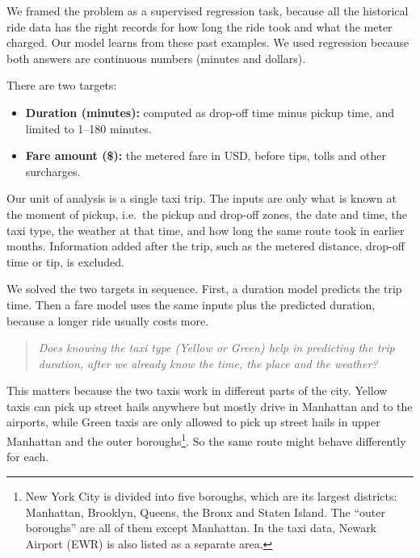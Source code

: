 \documentclass[12pt,a4paper]{article}
\makeatletter
\renewcommand\subsection{\@startsection{subsection}{2}{\z@}{-1.6ex\@plus -0.4ex \@minus -.2ex}{0.6ex \@plus .2ex}{\normalfont\large\bfseries}}
\makeatother
\begin{document}
We framed the problem as a supervised regression task, because all the historical ride data has the right records for how long the ride took and what the meter charged. Our model learns from these past examples. We used regression because both answers are continuous numbers (minutes and dollars).

There are two targets:
\begin{itemize}
  \item \textbf{Duration (minutes):} computed as drop-off time minus pickup time, and limited to 1--180 minutes.
  \item \textbf{Fare amount (\$):} the metered fare in USD, before tips, tolls and other surcharges.
\end{itemize}

Our unit of analysis is a single taxi trip. The inputs are only what is known at the moment of pickup, i.e.\ the pickup and drop-off zones, the date and time, the taxi type, the weather at that time, and how long the same route took in earlier months. Information added after the trip, such as the metered distance, drop-off time or tip, is excluded.

We solved the two targets in sequence. First, a duration model predicts the trip time. Then a fare model uses the same inputs plus the predicted duration, because a longer ride usually costs more.

\subsection{Research Question}

\begin{quote}
\itshape Does knowing the taxi type (Yellow or Green) help in predicting the trip duration, after we already know the time, the place and the weather?
\end{quote}

This matters because the two taxis work in different parts of the city. Yellow taxis can pick up street hails anywhere but mostly drive in Manhattan and to the airports, while Green taxis are only allowed to pick up street hails in upper Manhattan and the outer boroughs\footnote{New York City is divided into five boroughs, which are its largest districts: Manhattan, Brooklyn, Queens, the Bronx and Staten Island. The ``outer boroughs'' are all of them except Manhattan. In the taxi data, Newark Airport (EWR) is also listed as a separate area.}. So the same route might behave differently for each.
\end{document}
